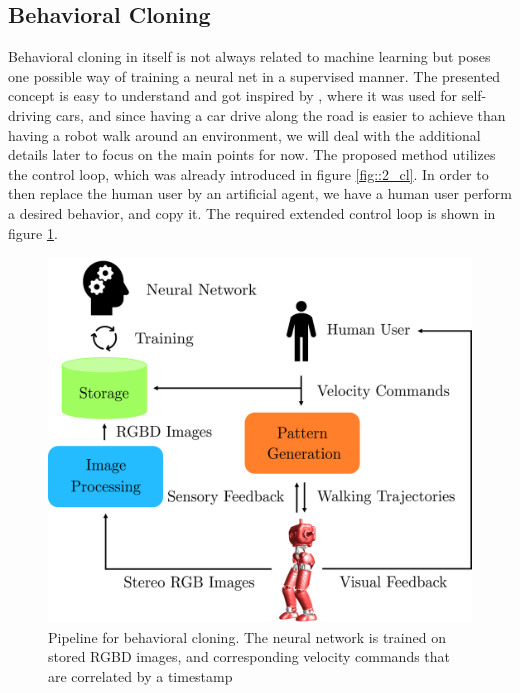 \FloatBarrier
\subsection{Behavioral Cloning}
\label{sec::222_bc}
Behavioral cloning in itself is not always related to machine learning but poses one possible way of training a neural net in a supervised manner. The presented concept is easy to understand and got inspired by \cite{bojarski2016end}, where it was used for self-driving cars, and since having a car drive along the road is easier to achieve than having a robot walk around an environment, we will deal with the additional details later to focus on the main points for now. The proposed method utilizes the control loop, which was already introduced in figure \ref{fig::2_cl}. In order to then replace the human user by an artificial agent, we have a human user perform a desired behavior, and copy it. The required extended control loop is shown in figure \ref{fig::222_bc}.
\begin{figure}[h!]
	\centering
	\includegraphics[scale=.5]{chapters/02_background/img/behavioral_cloning.png}
	\caption{Pipeline for behavioral cloning. The neural network is trained on stored RGBD images, and corresponding velocity commands that are correlated by a timestamp}
	\label{fig::222_bc}
\end{figure}
